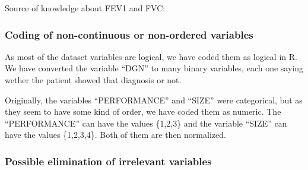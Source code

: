 Source of knowledge about FEV1 and FVC: \cite{pagina-fvc}






\subsubsection{Coding of non-continuous or non-ordered variables}

%
%
%

As most of the dataset variables are logical, we have coded them as logical in R. We have converted the variable ``DGN'' to many binary variables, each one saying wether the patient showed that diagnosis or not.

Originally, the variables ``PERFORMANCE'' and ``SIZE'' were categorical, but as they seem to have some kind of order, we have coded them as numeric. The ``PERFORMANCE'' can have the values \{1,2,3\} and the variable ``SIZE'' can have the values \{1,2,3,4\}. Both of them are then normalized.

\subsubsection{Possible elimination of irrelevant variables}\label{sec-elim-var}

